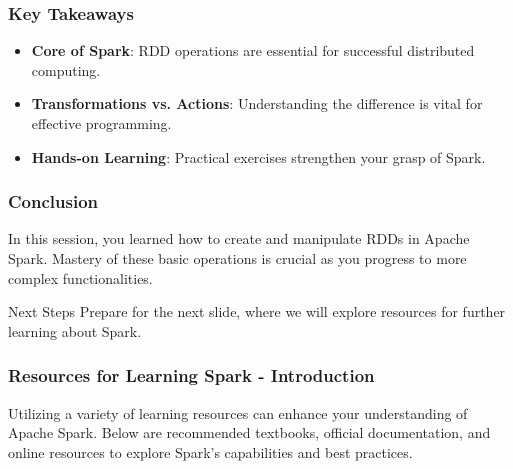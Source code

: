 \documentclass[aspectratio=169]{beamer}
\begin{document}
\begin{frame}
    \frametitle{Key Takeaways}
    \begin{itemize}
        \item \textbf{Core of Spark}: RDD operations are essential for successful distributed computing.
        \item \textbf{Transformations vs. Actions}: Understanding the difference is vital for effective programming.
        \item \textbf{Hands-on Learning}: Practical exercises strengthen your grasp of Spark.
    \end{itemize}
\end{frame}

\begin{frame}
    \frametitle{Conclusion}
    In this session, you learned how to create and manipulate RDDs in Apache Spark. Mastery of these basic operations is crucial as you progress to more complex functionalities. 
    \begin{block}{Next Steps}
        Prepare for the next slide, where we will explore resources for further learning about Spark.
    \end{block}
\end{frame}

\begin{frame}[fragile]
    \frametitle{Resources for Learning Spark - Introduction}
    Utilizing a variety of learning resources can enhance your understanding of Apache Spark. 
    Below are recommended textbooks, official documentation, and online resources to explore Spark's capabilities and best practices.
\end{frame}
\end{document}
